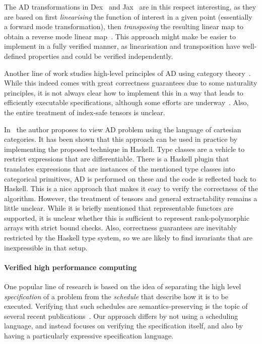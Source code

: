 The AD transformations in Dex~\cite{10.1145/3473593} and Jax~\cite{ad-jax} are
in this respect interesting, as they are based on first \emph{linearising} the
function of interest in a given point (essentially a forward mode
transformation), then \emph{transposing} the resulting linear map to obtain a
reverse mode linear map~\cite{radul2023you}. This approach might make be easier
to implement in a fully verified manner, as linearisation and transposition have
well-defined properties and could be verified independently.

Another line of work studies high-level principles of AD using category
theory~\cite{ad-theor1, ad-theor2, ad-theor3}. While this indeed comes with
great correctness guarantees due to some naturality principles, it is not always
clear how to implement this in a way that leads to efficiently executable
specifications, although some efforts are underway~\cite{10.1145/3632878}. Also,
the entire treatment of index-safe tensors is unclear.

In~\cite{ad-elliott} the author proposes to view AD problem using
the language of cartesian categories.  It has been shown that
this approach can be used in practice by implementing the proposed
technique in Haskell.  Type classes are a vehicle to restrict expressions
that are differentiable.  There is a Haskell plugin that translates
expressions that are instances of the mentioned type classes into
categorical primitives, AD is performed on these and the code is reflected
back to Haskell.  This is a nice approach that makes it easy
to verify the correctness of the algorithm.  However, the treatment
of tensors and general extractability remains a little unclear.
While it is briefly mentioned that representable functors
are supported, it is unclear whether this is sufficient to
represent rank-polymorphic arrays with strict bound checks.
Also, correctness guarantees are inevitably restricted by the
Haskell type system, so we are likely to find invariants that
are inexpressible in that setup.

\paragraph{Verified high performance computing}

One popular line of research is based on the idea of separating the
high level \emph{specification} of a problem from the \emph{schedule}
that describe how it is to be executed. Verifying that such schedules
are semantics-preserving is the topic of several recent
publications~\cite{10.1145/3527328,10.1145/3498717}. Our approach
differs by not using a scheduling language, and instead focuses on
verifying the specification itself, and also by having a particularly
expressive specification language.

